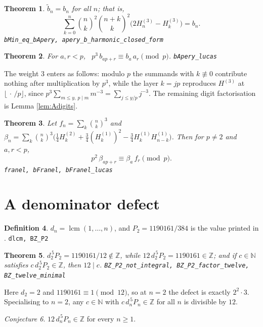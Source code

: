 \documentclass[11pt,a4paper]{amsart}
\theoremstyle{plain}
\newtheorem{theorem}{Theorem}[section]
\theoremstyle{definition}
\newtheorem{definition}[theorem]{Definition}
\theoremstyle{remark}
\newtheorem{conjecture}[theorem]{Conjecture}
\newcommand{\lean}[1]{\hfill\texttt{\footnotesize #1}}
\newcommand{\ZZ}{\mathbb{Z}}
\newcommand{\NN}{\mathbb{N}}
\DeclareMathOperator{\lcm}{lcm}
\begin{document}
\begin{theorem}\label{thm:closed}
$\tilde b_n=b_n$ for all $n$; that is,
\[
  \sum_{k=0}^n\binom nk^2\binom{n+k}k^2\bigl(2H^{(3)}_n-H^{(3)}_k\bigr)=b_n .
\]
\lean{bMin\_eq\_bApery, apery\_b\_harmonic\_closed\_form}
\end{theorem}

\begin{theorem}\label{thm:bA}
For $a,r<p$, \ $p^3\,b_{ap+r}\equiv b_a\,a_r\pmod p$.
\lean{bApery\_lucas}
\end{theorem}

The weight $3$ enters as follows: modulo $p$ the summands with $k\not\equiv0$ contribute
nothing after multiplication by $p^3$, while the layer $k=jp$ reproduces
$H^{(3)}$ at $\lfloor\,\cdot\,/p\rfloor$, since $p^3\sum_{m\le y,\ p\mid m}m^{-3}
=\sum_{j\le y/p}j^{-3}$. The remaining digit factorisation is Lemma \ref{lem:Adigits}.

\begin{theorem}\label{thm:franel}
Let $f_n=\sum_k\binom nk^3$ and
$\beta_n=\sum_k\binom nk^3\bigl(\tfrac14H^{(2)}_k+\tfrac34(H^{(1)}_k)^2
-\tfrac34H^{(1)}_kH^{(1)}_{n-k}\bigr)$. Then for $p\neq2$ and $a,r<p$,
\[
  p^2\,\beta_{ap+r}\equiv\beta_a\,f_r\pmod p .
\]
\lean{franel, bFranel, bFranel\_lucas}
\end{theorem}

\section{A denominator defect}

\begin{definition}
$d_n=\lcm(1,\dots,n)$, and $P_2=1190161/384$ is the value printed in \cite{BZ}.
\lean{dlcm, BZ\_P2}
\end{definition}

\begin{theorem}\label{thm:twelve}
$d_2^{\,5}P_2=1190161/12\notin\ZZ$, while $12\,d_2^{\,5}P_2=1190161\in\ZZ$; and if
$c\in\NN$ satisfies $c\,d_2^{\,5}P_2\in\ZZ$, then $12\mid c$.
\lean{BZ\_P2\_not\_integral, BZ\_P2\_factor\_twelve, BZ\_twelve\_minimal}
\end{theorem}

Here $d_2=2$ and $1190161\equiv1\pmod{12}$, so at $n=2$ the defect is exactly $2^2\cdot3$.
Specialising to $n=2$, any $c\in\NN$ with $c\,d_n^{\,5}P_n\in\ZZ$ for all $n$ is divisible
by $12$.

\begin{conjecture}\label{conj:twelve}
$12\,d_n^{\,5}P_n\in\ZZ$ for every $n\ge1$.
\end{conjecture}
\end{document}
